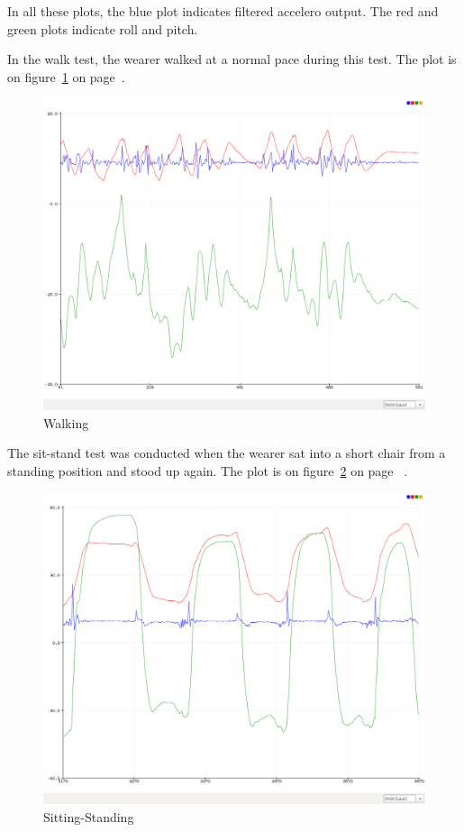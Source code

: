 \documentclass[11pt, a4paper]{article}
\begin{document}
In all these plots, the blue plot indicates filtered accelero output.
The red and green plots indicate roll and pitch.

\noindent In the walk test, the wearer walked at a normal pace during this
test. The plot is on figure~\ref{fig:walk} on page~\pageref{fig:walk}.
\begin{figure}
    \centering
    \includegraphics[width=0.75\linewidth]{walk.png}
    \caption{Walking}
    \label{fig:walk}
\end{figure}

\noindent The sit-stand test was conducted when the wearer sat into a short chair from a
standing position and stood up again. The plot is on figure~\ref{fig:ss} on page
~\pageref{fig:ss}.
\begin{figure}
    \centering
    \includegraphics[width=0.75\linewidth]{sit-stand.png}
    \caption{Sitting-Standing}
    \label{fig:ss}
\end{figure}
\end{document}
